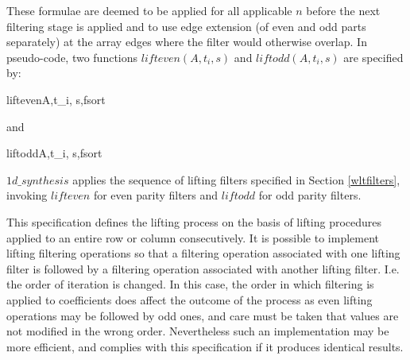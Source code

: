 These formulae are deemed to be applied for all applicable $n$
before the next filtering stage is applied and to use edge extension (of even and
odd parts separately) at the array
edges where the filter would otherwise overlap. In pseudo-code, two
functions $lifteven(A, t_i, s)$ and $liftodd(A, t_i, s)$ are specified by:

\begin{pseudo}{lifteven}{A,t_i, s,fsort}
    \bsEND
    \bsELSE
\bsEND
\end{pseudo}

and

\begin{pseudo}{liftodd}{A,t_i, s,fsort}
    \bsEND
    \bsELSE
\bsEND\end{pseudo}

$1d\_synthesis$ applies the sequence of lifting filters specified in Section \ref{wltfilters},
invoking $lifteven$ for even parity filters and $liftodd$ for odd parity filters.

\begin{informative}
This specification defines the lifting process on the basis of lifting
procedures applied to an entire row or column consecutively. It is
possible to implement lifting filtering operations so that a filtering
operation associated with one lifting filter is followed by a filtering
operation associated with another lifting filter. I.e. the order of
iteration is changed. In this case, the order in which filtering is
applied to coefficients does affect the outcome of the process as even
lifting operations may be followed by odd ones, and care must be taken
that values are not modified in the wrong order. Nevertheless such an
implementation may be more efficient, and complies with this
specification if it produces identical results.
\end{informative}

